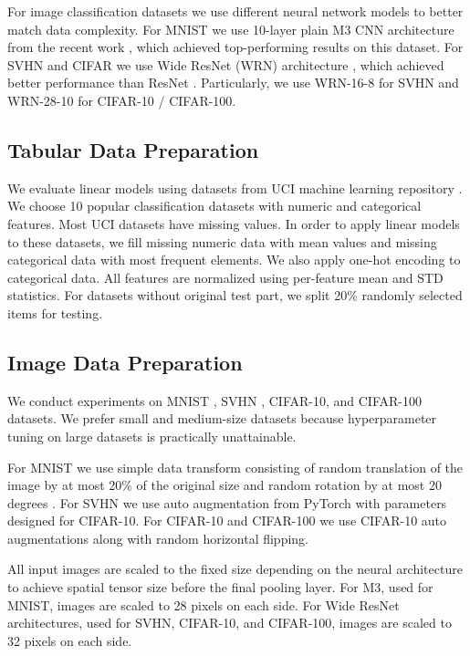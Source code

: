 \documentclass[nohyperref]{article}
\theoremstyle{plain}
\theoremstyle{definition}
\theoremstyle{remark}
\begin{document}
For image classification datasets we use different neural network models to better match data complexity. For MNIST we use 10-layer plain M3 CNN architecture from the recent work \cite{an2020simplecnn}, which achieved top-performing results on this dataset. For SVHN and CIFAR we use Wide ResNet (WRN) architecture \cite{zagoruyko2016wide}, which achieved better performance than ResNet \cite{he2016deep}. Particularly, we use WRN-16-8 for SVHN and WRN-28-10 for CIFAR-10 / CIFAR-100.

\subsection{Tabular Data Preparation}
We evaluate linear models using datasets from UCI machine learning repository \cite{Dua:2019}. We choose 10 popular classification datasets with numeric and categorical features. Most UCI datasets have missing values. In order to apply linear models to these datasets, we fill missing numeric data with mean values and missing categorical data with most frequent elements. We also apply one-hot encoding to categorical data. All features are normalized using per-feature mean and STD statistics. For datasets without original test part, we split 20\% randomly selected items for testing.

\subsection{Image Data Preparation}
We conduct experiments on MNIST \cite{lecun1998mnist}, SVHN \cite{netzer2011svhn}, CIFAR-10, and CIFAR-100 \cite{krizhevsky2009cifar} datasets. We prefer small and medium-size datasets because hyperparameter tuning on large datasets is practically unattainable.

For MNIST we use simple data transform consisting of random translation of the image by at most 20\% of the original size and random rotation by at most 20 degrees \cite{an2020simplecnn}. For SVHN we use auto augmentation \cite{cubuk2019autoaugment} from PyTorch \cite{NEURIPS2019_9015} with parameters designed for CIFAR-10. For CIFAR-10 and CIFAR-100 we use CIFAR-10 auto augmentations along with random horizontal flipping.

All input images are scaled to the fixed size depending on the neural architecture to achieve spatial tensor size \mbox{} before the final pooling layer. For M3, used for MNIST, images are scaled to 28 pixels on each side. For Wide ResNet architectures, used for SVHN, CIFAR-10, and CIFAR-100, images are scaled to 32 pixels on each side.
\end{document}
